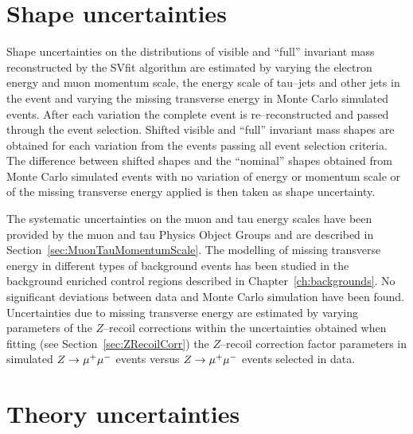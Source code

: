 \section{Shape uncertainties}
\label{sec:ShapeUncertainties}
%
Shape uncertainties on the distributions of visible and ``full'' invariant mass
reconstructed by the SVfit algorithm are estimated by varying the electron
energy and muon momentum scale, the energy scale of tau--jets and other jets in
the event and varying the missing transverse energy in Monte Carlo simulated
events.  After each variation the complete event is re--reconstructed and passed
through the event selection.  Shifted visible and ``full'' invariant mass shapes
are obtained for each variation from the events passing all event selection
criteria.  The difference between shifted shapes and the ``nominal'' shapes
obtained from Monte Carlo simulated events with no variation of energy or
momentum scale or of the missing transverse energy applied is then taken as
shape uncertainty.

The systematic uncertainties on the muon and tau energy scales have been
provided by the muon and tau Physics Object Groups and are described in
Section~\ref{sec:MuonTauMomentumScale}.  The modelling of missing transverse
energy in different types of background events has been studied in the
background enriched control regions described in Chapter~\ref{ch:backgrounds}.
No significant deviations between data and Monte Carlo simulation have been
found.  Uncertainties due to missing transverse energy are estimated by varying
parameters of the $Z$--recoil corrections within the uncertainties obtained when
fitting (see Section~\ref{sec:ZRecoilCorr}) the $Z$--recoil correction factor
parameters in simulated $Z \to \mu^+\mu^-$ events versus $Z \to \mu^+\mu^-$ events selected in
data.

\section{Theory uncertainties}

